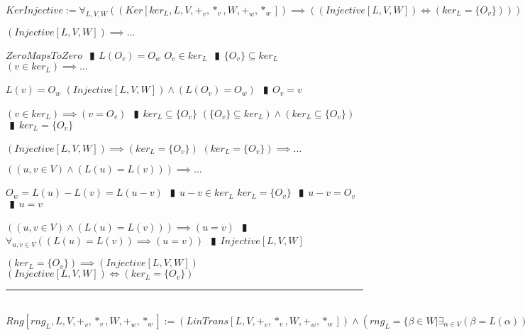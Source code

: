 \documentclass{book}
\newcommand{\abr}{:=}
\newcommand{\pipe}{$\phantom{(}\vrectangleblack\phantom{)}$}
\newcommand{\pr}[1]{\left(#1\right)}
\begin{document}
$KerInjective \abr \forall_{L, V, W}\pr{(Ker[ker_L, L, V, +_v, *_v, W, +_w, *_w]) \implies \pr{(Injective[L, V, W]) \iff (ker_L = \{O_v\})}}$
\begin{enumerate}
  \lit $(Injective[L, V, W]) \implies \ldots$
  \begin{enumerate}
    \lit $ZeroMapsToZero$ \pipe $L(O_v) = O_w$
    \lit $O_v \in ker_L$ \pipe $\{O_v\} \subseteq ker_L$
    \lit $(v \in ker_L) \implies \ldots$
    \begin{enumerate}
      \lit $L(v) = O_w$
      \lit $(Injective[L, V, W]) \land \pr{L(O_v) = O_w}$ \pipe $O_v = v$
    \end{enumerate}
    \lit $(v \in ker_L) \implies (v = O_v)$ \pipe $ker_L \subseteq \{O_v\}$
    \lit $(\{O_v\} \subseteq ker_L) \land (ker_L \subseteq \{O_v\})$ \pipe $ker_L = \{O_v\}$
  \end{enumerate}
  \lit $(Injective[L, V, W]) \implies (ker_L = \{O_v\})$
  \lit $(ker_L = \{O_v\}) \implies \ldots$
  \begin{enumerate}
    \lit $\pr{(u, v \in V) \land \pr{L(u) = L(v)}} \implies \ldots$
    \begin{enumerate}
      \lit $O_w = L(u) - L(v) = L(u - v)$ \pipe $u - v \in ker_L$
      \lit $ker_L = \{O_v\}$ \pipe $u - v = O_v$ \pipe $u = v$
    \end{enumerate}
    \lit $\pr{(u, v \in V) \land \pr{L(u) = L(v)}} \implies (u = v)$ \pipe $\forall_{u, v \in V}\pr{\pr{L(u) = L(v)} \implies (u = v)}$ \pipe $Injective[L, V, W]$
  \end{enumerate}
  \lit $(ker_L = \{O_v\}) \implies (Injective[L, V, W])$
  \lit $(Injective[L, V, W]) \iff (ker_L = \{O_v\})$
\end{enumerate} \vspace{.75mm} \hrule \vspace{.75mm} \ \\ 

$Rng[rng_L, L, V, +_v, *_v, W, +_w, *_w] \abr (LinTrans[L, V, +_v, *_v, W, +_w, *_w]) \land \pr{rng_L = \{\beta \in W | \exists_{\alpha \in V}\pr{\beta = L(\alpha)}\}}$ \\
\end{document}
